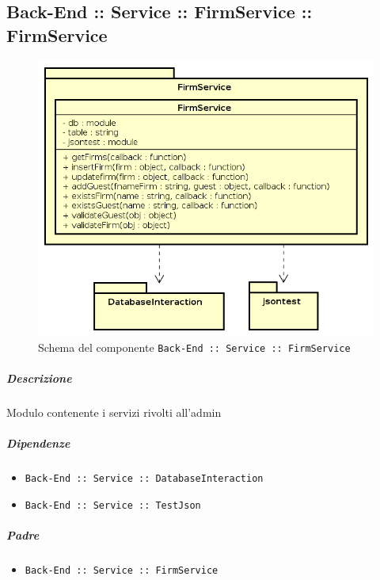 \documentclass[../ManualeSviluppatore_v1.0.0.tex]{subfiles}
\begin{document}
\subsection{Back-End :: Service :: FirmService :: FirmService}
\begin{figure}[!h]
	\centering
	\includegraphics[scale=0.6]{Architettura/Back-End/Service/FirmService.png}
	\caption{Schema del componente \texttt{Back-End :: Service :: FirmService}}
\end{figure}
\subparagraph{Descrizione} Modulo contenente i servizi rivolti all'admin
\subparagraph{Dipendenze}
\begin{itemize}
	\item \texttt{Back-End :: Service :: DatabaseInteraction}
	\item \texttt{Back-End :: Service :: TestJson}
\end{itemize}
\subparagraph{Padre}
\begin{itemize}
	\item \texttt{Back-End :: Service :: FirmService}
\end{itemize}
\end{document}
